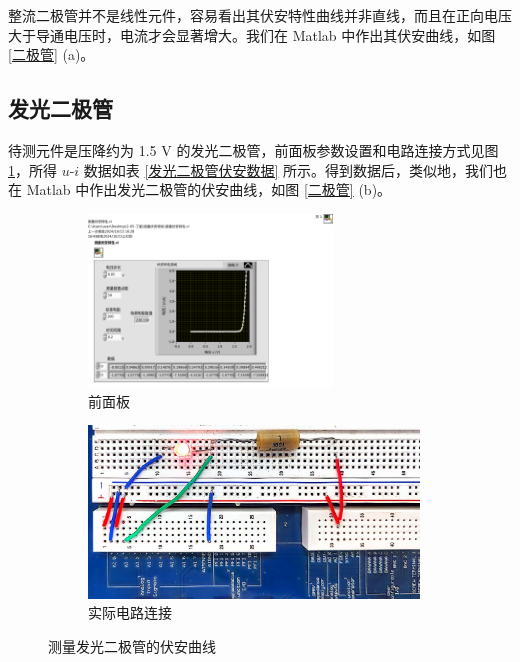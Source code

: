 \documentclass[UTF8]{article}
\theoremstyle{MyLineTheoremStyle} %
\theoremstyle{MyBlockTheoremStyle} %
\theoremstyle{MySubsubsectionStyle} %
\begin{document}
整流二极管并不是线性元件，容易看出其伏安特性曲线并非直线，而且在正向电压大于导通电压时，电流才会显著增大。我们在 Matlab 中作出其伏安曲线，如图 \ref{二极管} (a)。


\subsection{发光二极管}


待测元件是压降约为 1.5 V 的发光二极管，前面板参数设置和电路连接方式见图 \ref{测量发光二极管的伏安曲线}，所得 $u$-$i$ 数据如表 \ref{发光二极管伏安数据} 所示。得到数据后，类似地，我们也在 Matlab 中作出发光二极管的伏安曲线，如图 \ref{二极管} (b)。

\begin{figure}[H]\centering
    \begin{subfigure}[b]{0.45\columnwidth}\centering
        \includegraphics[height=130pt]{assets/测量伏安曲线__发光二极管.pdf}
        \caption{前面板}
    \end{subfigure}\hfill
    \begin{subfigure}[b]{0.55\columnwidth}\centering
        \includegraphics[height=130pt]{assets/测量伏安曲线__发光二极管.jpg}
        \caption{实际电路连接}
    \end{subfigure}
    \caption{测量发光二极管的伏安曲线}
    \label{测量发光二极管的伏安曲线}
\end{figure}
\vspace*{-5mm}
\end{document}
